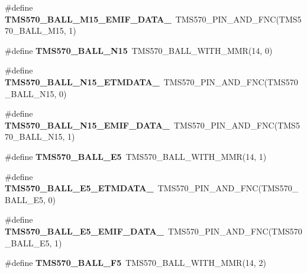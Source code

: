 \begin{DoxyCompactItemize}
\#define {\bfseries T\+M\+S570\+\_\+\+B\+A\+L\+L\+\_\+\+M15\+\_\+\+E\+M\+I\+F\+\_\+\+D\+A\+T\+A\+\_}~T\+M\+S570\+\_\+\+P\+I\+N\+\_\+\+A\+N\+D\+\_\+\+F\+NC(T\+M\+S570\+\_\+\+B\+A\+L\+L\+\_\+\+M15, 1)
\item 
\mbox{\label{tms570lc4357-pins_8h_a7690b53a678030ae1d9fc5711f084c4e}} 
\#define {\bfseries T\+M\+S570\+\_\+\+B\+A\+L\+L\+\_\+\+N15}~T\+M\+S570\+\_\+\+B\+A\+L\+L\+\_\+\+W\+I\+T\+H\+\_\+\+M\+MR(14, 0)
\item 
\mbox{\label{tms570lc4357-pins_8h_a9f0e54ecc7736b800bb8accf22643c6b}} 
\#define {\bfseries T\+M\+S570\+\_\+\+B\+A\+L\+L\+\_\+\+N15\+\_\+\+E\+T\+M\+D\+A\+T\+A\+\_}~T\+M\+S570\+\_\+\+P\+I\+N\+\_\+\+A\+N\+D\+\_\+\+F\+NC(T\+M\+S570\+\_\+\+B\+A\+L\+L\+\_\+\+N15, 0)
\item 
\mbox{\label{tms570lc4357-pins_8h_a07fb878c120c6540b1a9589f42aa0ae0}} 
\#define {\bfseries T\+M\+S570\+\_\+\+B\+A\+L\+L\+\_\+\+N15\+\_\+\+E\+M\+I\+F\+\_\+\+D\+A\+T\+A\+\_}~T\+M\+S570\+\_\+\+P\+I\+N\+\_\+\+A\+N\+D\+\_\+\+F\+NC(T\+M\+S570\+\_\+\+B\+A\+L\+L\+\_\+\+N15, 1)
\item 
\mbox{\label{tms570lc4357-pins_8h_a0cb99b6fb7157c169c7ecda51a357643}} 
\#define {\bfseries T\+M\+S570\+\_\+\+B\+A\+L\+L\+\_\+\+E5}~T\+M\+S570\+\_\+\+B\+A\+L\+L\+\_\+\+W\+I\+T\+H\+\_\+\+M\+MR(14, 1)
\item 
\mbox{\label{tms570lc4357-pins_8h_ae488629db26494ef2b425adc542ea399}} 
\#define {\bfseries T\+M\+S570\+\_\+\+B\+A\+L\+L\+\_\+\+E5\+\_\+\+E\+T\+M\+D\+A\+T\+A\+\_}~T\+M\+S570\+\_\+\+P\+I\+N\+\_\+\+A\+N\+D\+\_\+\+F\+NC(T\+M\+S570\+\_\+\+B\+A\+L\+L\+\_\+\+E5, 0)
\item 
\mbox{\label{tms570lc4357-pins_8h_ae2c9fc58d436855df60df5832f461251}} 
\#define {\bfseries T\+M\+S570\+\_\+\+B\+A\+L\+L\+\_\+\+E5\+\_\+\+E\+M\+I\+F\+\_\+\+D\+A\+T\+A\+\_}~T\+M\+S570\+\_\+\+P\+I\+N\+\_\+\+A\+N\+D\+\_\+\+F\+NC(T\+M\+S570\+\_\+\+B\+A\+L\+L\+\_\+\+E5, 1)
\item 
\mbox{\label{tms570lc4357-pins_8h_a29ad0877544646d7b8ef3e3148321141}} 
\#define {\bfseries T\+M\+S570\+\_\+\+B\+A\+L\+L\+\_\+\+F5}~T\+M\+S570\+\_\+\+B\+A\+L\+L\+\_\+\+W\+I\+T\+H\+\_\+\+M\+MR(14, 2)

\end{DoxyCompactItemize}
